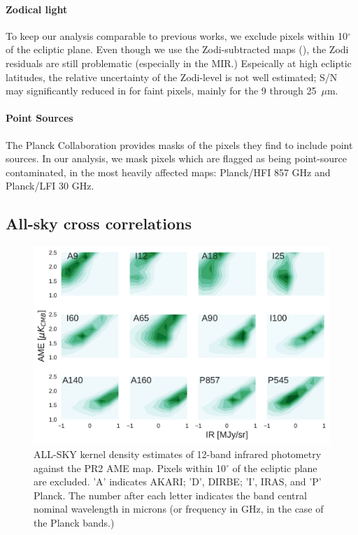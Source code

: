       \paragraph{Zodical light}
        To keep our analysis comparable to previous works, we exclude pixels within 10$^{\circ}$ of the ecliptic plane. Even though we use the Zodi-subtracted maps (\citep{kelsall98, kondo16}), the Zodi residuals are still problematic (especially in the MIR.) Espeically at high ecliptic latitudes, the relative uncertainty of the Zodi-level is not well estimated; S/N may significantly reduced in for faint pixels, mainly for the 9 through 25~$\mu$m.

     \paragraph{Point Sources}
       The Planck Collaboration provides masks of the pixels they find to include point sources. In our analysis, we mask pixels which are flagged as being point-source contaminated, in the most heavily affected maps: Planck/HFI 857 GHz and Planck/LFI 30 GHz.


  \subsection{All-sky cross correlations}

        \begin{figure}

          \includegraphics[width=\textwidth]{../Plots/AMEvsDust_allsky_allbands.pdf}
          \centering
          \caption{ALL-SKY kernel density estimates of 12-band infrared photometry against the PR2 AME map. Pixels within 10$^{\circ}$ of the ecliptic plane are excluded. 'A' indicates AKARI; 'D', DIRBE; 'I', IRAS, and 'P' Planck. The number after each letter indicates the band central nominal wavelength in microns (or frequency in GHz, in the case of the Planck bands.) }
          \label{fig:AMEvsDust_allsky_allbands}
        \end{figure}

